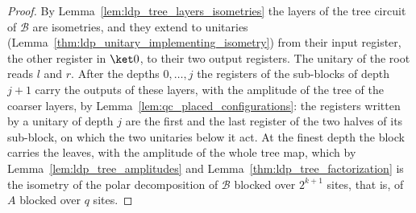 \begin{proof}
    \leanok
    By Lemma~\ref{lem:ldp_tree_layers_isometries} the layers of the tree circuit
    of $\mathcal B$ are isometries, and they extend to unitaries
    (Lemma~\ref{thm:ldp_unitary_implementing_isometry}) from their input
    register, the other register in $\ket0$, to their two output registers.
    The unitary of the root reads $l$ and $r$. After the depths $0,\dots,j$ the
    registers of the sub-blocks of depth $j+1$ carry the outputs of these
    layers, with the amplitude of the tree of the coarser layers, by
    Lemma~\ref{lem:qc_placed_configurations}: the registers written by
    a unitary of depth $j$ are the first and the last register of the two
    halves of its sub-block, on which the two unitaries below it act. At the
    finest depth the block carries the leaves, with the amplitude of the whole
    tree map, which by Lemma~\ref{lem:ldp_tree_amplitudes} and
    Lemma~\ref{thm:ldp_tree_factorization} is the isometry of the polar
    decomposition of $\mathcal B$ blocked over $2^{k+1}$ sites, that is, of
    $A$ blocked over $q$ sites.
\end{proof}

